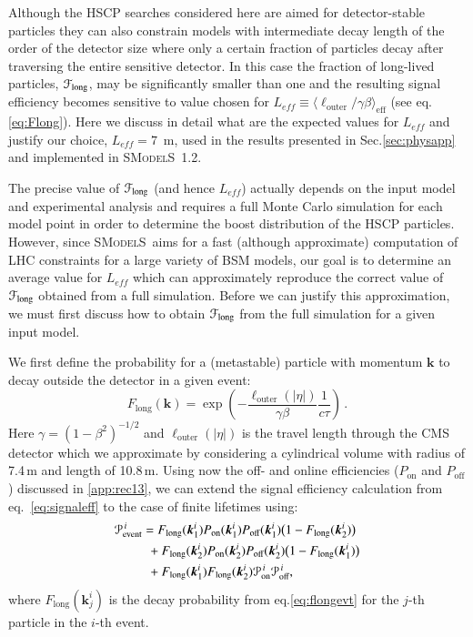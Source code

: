 \documentclass[preprint,number,sort&compress,twocolumn,3p]{elsstyarticle}
\renewcommand{\vec}[1]{\boldsymbol{#1}}
\newcommand{\smo}{\textsc{SModelS}}
\begin{document}
\begin{appendix}
Although the HSCP searches considered here are aimed for detector-stable particles
they can also constrain models with intermediate decay length of the order of the detector size
where only a certain fraction of particles decay after traversing the entire sensitive detector. In this case the fraction of long-lived particles, ${\cal F}_\mathrm{long}$, may be significantly smaller than one and the resulting signal efficiency becomes sensitive to value chosen for $L_{eff} \equiv \langle\ell_\text{outer}/\gamma\beta\rangle_\text{eff}$ (see eq.\ref{eq:Flong}).
Here we discuss in detail what are the expected values for $L_{eff}$ and justify our choice, $L_{eff}  = 7$~m, used in the results presented in Sec.\ref{sec:physapp} and implemented in \smo~1.2. 


The precise value of ${\cal F}_\mathrm{long}$ (and hence $L_{eff}$) 
actually depends on the input model and experimental analysis and
requires a full Monte Carlo simulation for each model point in order to determine the boost distribution of the HSCP particles. However, since \smo\ aims for a fast (although approximate)
computation of LHC constraints for a large variety of BSM models, our
goal is to determine an average value for $L_{eff}$ which can approximately reproduce the correct value of ${\cal F}_\mathrm{long}$ obtained from a full simulation.
Before we can justify this approximation, we must first discuss how to obtain  ${\cal F}_\mathrm{long}$ from the full simulation for a given input model. 


We first define the probability for a (metastable) particle with momentum $\vec{k}$ to decay outside the detector in a given event:
\begin{equation}
\label{eq:flongevt}
F_\text{long}(\vec{k}) = \exp\left(-\frac{\ell_\text{outer}(|\eta|)}{\gamma \beta }\frac{1}{c\tau}\right)\,.
\end{equation}
Here $\gamma = (1-\beta^2)^{-1/2}$ and $\ell_\text{outer}(|\eta|)$ is the travel length
through the CMS detector which we approximate by considering a cylindrical volume with radius of 7.4\,m and length of 10.8\,m.
Using now the off- and online efficiencies ($P_{\text{on}}$ and $P_{\text{off}}$) discussed in \ref{app:rec13}, we can
extend the signal efficiency calculation from
eq.~\eqref{eq:signaleff} to the case of finite lifetimes using:
\begin{equation}
\begin{split}
\label{eq:Pevfull}
{\cal P}^{\,i}_\text{event} = &\;
F_\mathrm{long}(\vec{k}_1^i)  P_{\text{on}}(\vec{k}_1^i) P_{\text{off}}(\vec{k}_1^i) \big(1- F_\mathrm{long}(\vec{k}_2^i)\big)\\
&\!\!\!+F_\mathrm{long}(\vec{k}_2^i)  P_{\text{on}}(\vec{k}_2^i) P_{\text{off}}(\vec{k}_2^i) \big(1- F_\mathrm{long}(\vec{k}_1^i)\big)\\
&\!\!\!+ F_\mathrm{long}(\vec{k}_1^i) F_\mathrm{long}(\vec{k}_2^i) {\cal P}^{\,i}_\text{on} {\cal P}^{\,i}_\text{off},
\end{split}
\end{equation}
where $F_\text{long}(\vec{k}_j^i)$ is the decay probability from eq.\ref{eq:flongevt} for the $j$-th particle in the $i$-th event.




\end{appendix}
\end{document}
